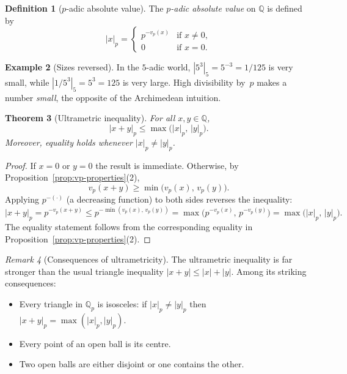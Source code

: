 \documentclass[12pt,a4paper,openany]{book}
\theoremstyle{definition}
\newtheorem{definition}{Definition}[chapter]
\newtheorem{example}[definition]{Example}
\theoremstyle{plain}
\newtheorem{theorem}[definition]{Theorem}
\theoremstyle{remark}
\newtheorem{remark}[definition]{Remark}
\newcommand{\Q}{\mathbb{Q}}
\newcommand{\abs}[1]{\left|#1\right|}
\begin{document}
\begin{definition}[$p$-adic absolute value]
\label{def:p-adic-abs}
The \emph{$p$-adic absolute value} on $\Q$ is defined by
\[
  \abs{x}_p =
  \begin{cases}
    p^{-v_p(x)} & \text{if } x \neq 0,\\
    0            & \text{if } x = 0.
  \end{cases}
\]
\end{definition}

\begin{example}[Sizes reversed]
\label{ex:p-adic-sizes}
In the $5$-adic world, $\abs{5^3}_5 = 5^{-3} = 1/125$ is very small, while
$\abs{1/5^3}_5 = 5^3 = 125$ is very large. High divisibility by~$p$ makes a
number \emph{small}, the opposite of the Archimedean intuition.
\end{example}

\begin{theorem}[Ultrametric inequality]
\label{thm:ultrametric}
For all $x, y \in \Q$,
\[
  \abs{x + y}_p \leq \max\bigl(\abs{x}_p,\, \abs{y}_p\bigr).
\]
Moreover, equality holds whenever $\abs{x}_p \neq \abs{y}_p$.
\end{theorem}

\begin{proof}
If $x = 0$ or $y = 0$ the result is immediate. Otherwise, by
Proposition~\ref{prop:vp-properties}(2),
\[
  v_p(x+y) \geq \min\bigl(v_p(x),\, v_p(y)\bigr).
\]
Applying $p^{-(\cdot)}$ (a decreasing function) to both sides reverses the
inequality:
\[
  \abs{x+y}_p = p^{-v_p(x+y)} \leq p^{-\min(v_p(x),\, v_p(y))}
  = \max\bigl(p^{-v_p(x)},\, p^{-v_p(y)}\bigr)
  = \max\bigl(\abs{x}_p,\, \abs{y}_p\bigr).
\]
The equality statement follows from the corresponding equality in
Proposition~\ref{prop:vp-properties}(2).
\end{proof}

\begin{remark}[Consequences of ultrametricity]
\label{rem:ultrametric-consequences}
The ultrametric inequality is far stronger than the usual triangle inequality
$\abs{x+y}\leq\abs{x}+\abs{y}$. Among its striking consequences:
\begin{itemize}
  \item Every triangle in $\Q_p$ is isosceles: if $\abs{x}_p \neq \abs{y}_p$
    then $\abs{x+y}_p = \max(\abs{x}_p, \abs{y}_p)$.
  \item Every point of an open ball is its centre.
  \item Two open balls are either disjoint or one contains the other.
\end{itemize}
\end{remark}
\end{document}
